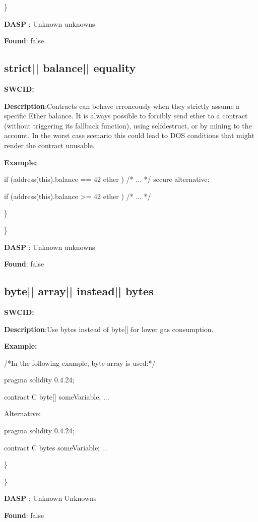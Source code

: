 \documentclass{article}
\begin{document}
\} 

\textbf{DASP} : Unknown unknowns

\textbf{Found}: false

\subsection{strict{|\textunderscore| }balance{|\textunderscore| }equality} 
\textbf{SWC{\textunderscore }ID:} 

\textbf{Description}:Contracts can behave erroneously when they strictly assume a specific Ether balance. It is always possible to forcibly send ether to a contract (without triggering its fallback function), using selfdestruct, or by mining to the account. In the worst case scenario this could lead to DOS conditions that might render the contract unusable.


\textbf{Example:} 
\begin{ffcode} 

if (address(this).balance == 42 ether ) {
    /* ... */
}
 secure alternative:

if (address(this).balance >= 42 ether ) {
  /* ... */
}

\end{ffcode} 
\} 

\} 

\textbf{DASP} : Unknown unknowns

\textbf{Found}: false

\subsection{byte{|\textunderscore| }array{|\textunderscore| }instead{|\textunderscore| }bytes} 
\textbf{SWC{\textunderscore }ID:} 

\textbf{Description}:Use bytes instead of byte[] for lower gas consumption.


\textbf{Example:} 
\begin{ffcode} 

/*In the following example, byte array is used:*/ 

pragma solidity 0.4.24;

contract C {
    byte[] someVariable;
    ...
}

Alternative:

pragma solidity 0.4.24;

contract C {
    bytes someVariable;
    ...
}

\end{ffcode} 
\} 

\} 

\textbf{DASP} : Unknown Unknowns

\textbf{Found}: false
\end{document}
